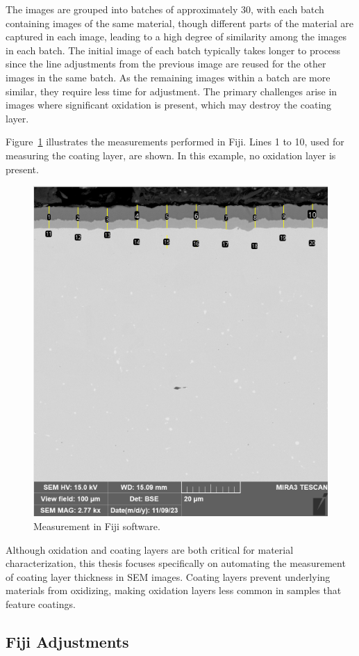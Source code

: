 The images are grouped into batches of approximately 30, with each batch containing images of the same material, though different parts of the material are captured in each image, leading to a high degree of similarity among the images in each batch. The initial image of each batch typically takes longer to process since the line adjustments from the previous image are reused for the other images in the same batch. As the remaining images within a batch are more similar, they require less time for adjustment. The primary challenges arise in images where significant oxidation is present, which may destroy the coating layer.

Figure~\ref{fig:Fiji} illustrates the measurements performed in Fiji. Lines 1 to 10, used for measuring the coating layer, are shown. In this example, no oxidation layer is present.

\begin{figure}[H]
    \centering
    \includegraphics[width=0.7\linewidth]{PICTURES/625_Al2O3_3500h_low_cross_strana2_13_measurements.png}
    \caption{Measurement in Fiji software.}
    \label{fig:Fiji}
\end{figure}

\newpage
Although oxidation and coating layers are both critical for material characterization, this thesis focuses specifically on automating the measurement of coating layer thickness in SEM images. Coating layers prevent underlying materials from oxidizing, making oxidation layers less common in samples that feature coatings.


\subsection{Fiji Adjustments}\label{sec:1.2.2}

